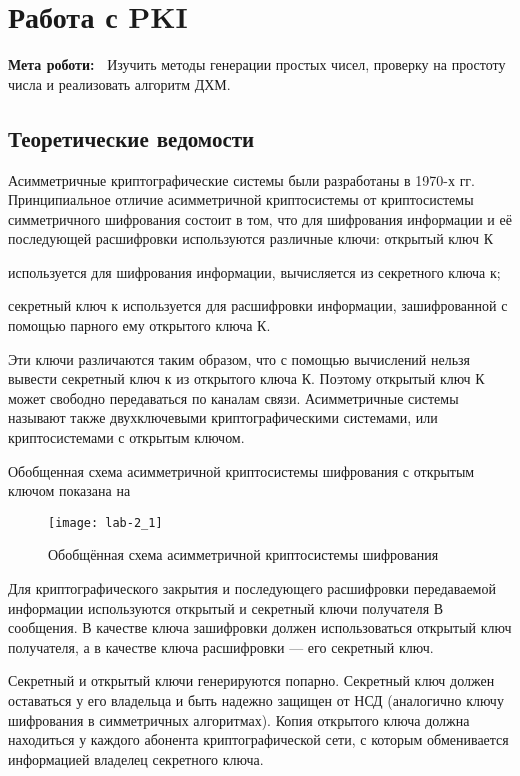 \chapter{Работа с PKI} \label{chapt2}%
\textbf{Мета роботи:~}%
Изучить методы генерации простых чисел, проверку на простоту числа и
реализовать алгоритм ДХМ.
\section{Теоретические ведомости} \label{sect2_a}
Асимметричные криптографические системы были разработаны в 1970-х гг.
Принципиальное отличие асимметричной криптосистемы от криптосистемы
симметричного шифрования состоит в том, что для шифрования информации и её
последующей расшифровки используются различные ключи: открытый ключ К
\begin{Notes}
\item используется для шифрования информации, вычисляется из секретного ключа
    к;
\item секретный ключ к используется для расшифровки информации,
    зашифрованной с помощью парного ему открытого ключа К.
\end{Notes}

Эти ключи различаются таким образом, что с помощью вычислений нельзя вывести
секретный ключ к из открытого ключа К. Поэтому открытый ключ К может свободно
передаваться по каналам связи.
Асимметричные системы называют также
двухключевыми криптографическими системами, или криптосистемами с открытым
ключом.

Обобщенная схема асимметричной криптосистемы шифрования с открытым ключом
показана на 
\begin{figure}[h]
  \centering
  \texttt{[image: lab-2\_1]}
  \caption{Обобщённая схема асимметричной криптосистемы шифрования}\label{img:2_1}
\end{figure}

Для криптографического закрытия и последующего расшифровки передаваемой
информации используются открытый и секретный ключи получателя В сообщения. В
качестве ключа зашифровки должен использоваться открытый ключ получателя, а в
качестве ключа расшифровки — его секретный ключ.

Секретный и открытый ключи генерируются попарно. Секретный ключ должен
оставаться у его владельца и быть надежно защищен от НСД (аналогично ключу
шифрования в симметричных алгоритмах). Копия открытого ключа должна
находиться у каждого абонента криптографической сети, с которым обменивается
информацией владелец секретного ключа.

